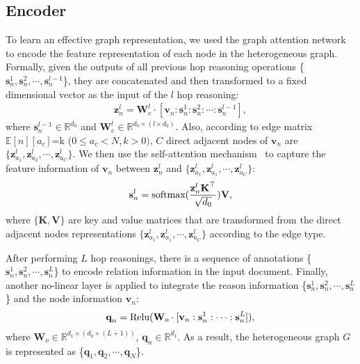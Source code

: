 \documentclass[letterpaper]{article} \usepackage{aaai21}  \usepackage{times}  \usepackage{helvet} \usepackage{courier}  \usepackage[hyphens]{url}  \usepackage{graphicx} \urlstyle{rm} \def\UrlFont{\rm}  \usepackage{natbib}  \usepackage{caption} \frenchspacing  \setlength{\pdfpagewidth}{8.5in}  \setlength{\pdfpageheight}{11in}  \usepackage{amsmath}
\begin{document}
\subsection{Encoder}
\label{Sec3-1}
To learn an effective graph representation, we used the graph attention network~\cite{guo-etal-2019-attention} to encode the feature representation of each node in the heterogeneous graph.
Formally, given the outputs of all previous hop reasoning operations \{$\textbf{s}^{1}_{n}, \textbf{s}^{2}_{n}, \cdots, \textbf{s}^{l-1}_{n}$\},
they are concatenated and then transformed to a fixed dimensional vector as the input of the $l$ hop reasoning:\begin{equation}
\begin{aligned}
\textbf{z}^l_n=\textbf{W}_e^l\cdot[\textbf{v}_n:\textbf{s}^{1}_{n}:\textbf{s}^{2}_{n}:\cdots:\textbf{s}^{l-1}_{n}],
\label{eq2:InputOfCNN}
\end{aligned}
\end{equation}
where $\textbf{s}^{l-1}_n$$\in$$\mathbb{R}^{d_0}$ and $\textbf{W}^l_e$$\in$$\mathbb{R}^{d_0\times (l\times d_0)}$.
Also, according to edge matrix $\mathbb{E}[n][a_c]$=k ($0 \le a_c < N, k>0)$, $C$ direct adjacent nodes of $\textbf{v}_n$ are $\{\textbf{z}^{l}_{a_1},\textbf{z}^{l}_{a_2}, \cdots, \textbf{z}^{l}_{a_C}\}$.
We then use the self-attention mechanism~\cite{NIPS2017_7181} to capture the feature information of $\textbf{v}_n$ between $\textbf{z}^l_n$ and $\{\textbf{z}^{l}_{a_1}, \textbf{z}^{l}_{a_1}, \cdots, \textbf{z}^{l}_{a_C}\}$:
\begin{equation}
\textbf{s}^{l}_{n}=\textup{softmax}(\frac{\textbf{z}^l_n\textbf{K}^{\top}}{\sqrt{d_{0}}})\textbf{V},
\label{eq5:Self-Attetion}
\end{equation}
where $\{\textbf{K}, \textbf{V}\}$ are key and value matrices that are transformed from the direct adjacent nodes representations $\{\textbf{z}^{l}_{a_1}, \textbf{z}^{l}_{a_1}, \cdots, \textbf{z}^{l}_{a_C}\}$ according to the edge type.


After performing $L$ hop reasonings, there is a sequence of annotations \{$\textbf{s}^{1}_{n}, \textbf{s}^{2}_{n}, \cdots, \textbf{s}^{L}_{n}$\} to encode relation information in the input document.
Finally, another no-linear layer is applied to integrate the reason information \{$\textbf{s}^{1}_{n}, \textbf{s}^{2}_{n}, \cdots, \textbf{s}^{L}_{n}$\} and the node information $\textbf{v}_n$:
\begin{equation}
\begin{aligned}
\textbf{q}_n=\textup{Relu}(\textbf{W}_{o}\cdot[\textbf{v}_n:\textbf{s}^1_n:\cdots:\textbf{s}^L_n]),
\label{eq3:ConvolutionOperation}
\end{aligned}
\end{equation}
where $\textbf{W}_{o}$$\in$$\mathbb{R}^{d_1 \times (d_0 \times (L+1))}$,
$\textbf{q}_n$$\in$$\mathbb{R}^{d_1}$.
As a result, the heterogeneous graph $G$ is represented as \{$\textbf{q}_1, \textbf{q}_2, \cdots, \textbf{q}_N$\}.
\end{document}
